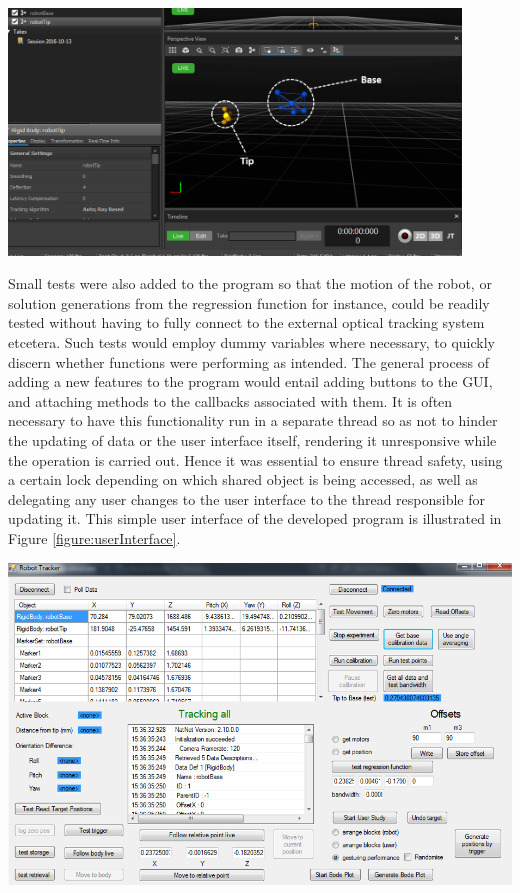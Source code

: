 \documentclass[11pt]{article}
\begin{document}
\begin{center}
\includegraphics[width=0.9\textwidth]{images/motiveScreenshot2.png}
\label{figure:motiveInterface}
\end{center}


Small tests were also added to the program so that the motion of the robot, or solution generations from the regression function for instance, could be readily tested without having to fully connect to the external optical tracking system etcetera. Such tests would employ dummy variables where necessary, to quickly discern whether functions were performing as intended. The general process of adding a new features to the program would entail adding buttons to the GUI, and attaching methods to the callbacks associated with them. It is often necessary to have this functionality run in a separate thread so as not to hinder the updating of data or the user interface itself, rendering it unresponsive while the operation is carried out. Hence it was essential to ensure thread safety, using a certain lock depending on which shared object is being accessed, as well as delegating any user changes to the user interface to the thread responsible for updating it. This simple user interface of the developed program is illustrated in Figure \ref{figure:userInterface}.

\begin{center}
\includegraphics[width=\textwidth]{images/gui2.png}
\label{figure:userInterface}
\end{center}
\end{document}
